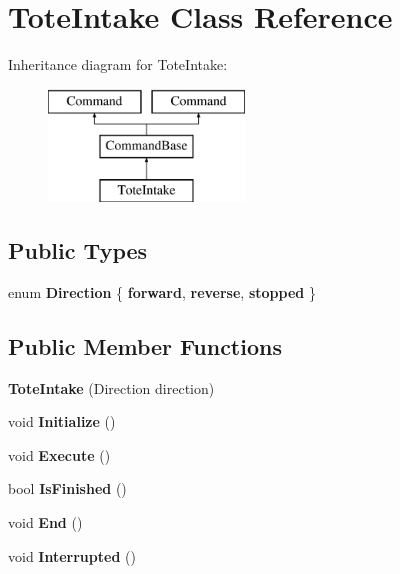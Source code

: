 \hypertarget{class_tote_intake}{}\section{Tote\+Intake Class Reference}
\label{class_tote_intake}
Inheritance diagram for Tote\+Intake\+:\begin{figure}[H]
\begin{center}
\leavevmode
\includegraphics[height=3.000000cm]{class_tote_intake}
\end{center}
\end{figure}
\subsection*{Public Types}
\begin{DoxyCompactItemize}
\item 
\hypertarget{class_tote_intake_a526041a98825e90d7d0db04bf2ad3154}{}enum {\bfseries Direction} \{ {\bfseries forward}, 
{\bfseries reverse}, 
{\bfseries stopped}
 \}\label{class_tote_intake_a526041a98825e90d7d0db04bf2ad3154}

\end{DoxyCompactItemize}
\subsection*{Public Member Functions}
\begin{DoxyCompactItemize}
\item 
\hypertarget{class_tote_intake_ab16b0556811e80666c33603406270ff7}{}{\bfseries Tote\+Intake} (Direction direction)\label{class_tote_intake_ab16b0556811e80666c33603406270ff7}

\item 
\hypertarget{class_tote_intake_a827598afdc7b43772bce4964e86388b3}{}void {\bfseries Initialize} ()\label{class_tote_intake_a827598afdc7b43772bce4964e86388b3}

\item 
\hypertarget{class_tote_intake_a034514f1dc307f9e7d609403496931b0}{}void {\bfseries Execute} ()\label{class_tote_intake_a034514f1dc307f9e7d609403496931b0}

\item 
\hypertarget{class_tote_intake_af56496899456386ddd5a1396ceaa44e2}{}bool {\bfseries Is\+Finished} ()\label{class_tote_intake_af56496899456386ddd5a1396ceaa44e2}

\item 
\hypertarget{class_tote_intake_a1e801691281940bcc410dfcd1a3f13ac}{}void {\bfseries End} ()\label{class_tote_intake_a1e801691281940bcc410dfcd1a3f13ac}

\item 
\hypertarget{class_tote_intake_a08d4690348e422e6dfedcff4758edaf7}{}void {\bfseries Interrupted} ()\label{class_tote_intake_a08d4690348e422e6dfedcff4758edaf7}

\end{DoxyCompactItemize}
